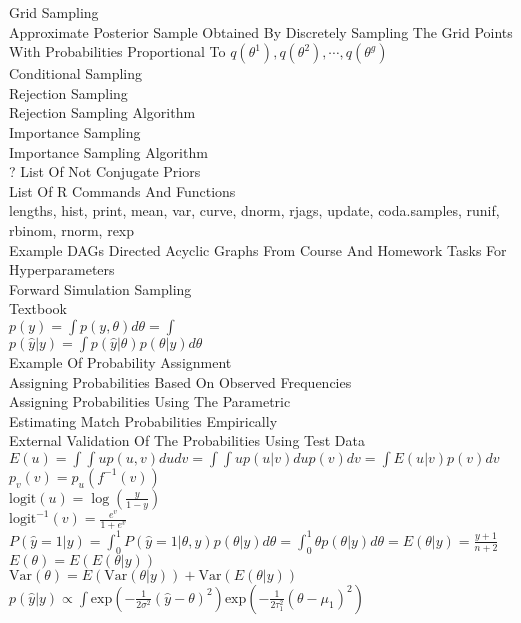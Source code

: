 Grid Sampling \\
Approximate Posterior Sample Obtained By Discretely Sampling The Grid Points With Probabilities Proportional To $q(\theta^1), q(\theta^2), \cdots, q(\theta^g)$ \\
Conditional Sampling \\
Rejection Sampling \\
Rejection Sampling Algorithm \\
Importance Sampling \\
Importance Sampling Algorithm \\
? List Of Not Conjugate Priors \\
List Of R Commands And Functions \\
lengths, hist, print, mean, var, curve, dnorm, rjags, update, coda.samples, runif, rbinom, rnorm, rexp \\
Example DAGs Directed Acyclic Graphs From Course And Homework Tasks For Hyperparameters \\
Forward Simulation Sampling \\
Textbook \\
$p(y)=\int p(y,\theta)d\theta=\int $ \\
$p(\hat{y}|y)=\int p(\hat{y}|\theta)p(\theta|y)d\theta$ \\
Example Of Probability Assignment \\
Assigning Probabilities Based On Observed Frequencies \\
Assigning Probabilities Using The Parametric \\
Estimating Match Probabilities Empirically \\
External Validation Of The Probabilities Using Test Data \\
$E(u)=\int \int up(u,v)dudv=\int \int up(u|v)du p(v)dv=\int E(u|v)p(v)dv$ \\
$p_v(v)=p_u(f^{-1}(v))$ \\
$\text{logit}(u)=\log \left(\frac{y}{1-y} \right)$ \\
$\text{logit}^{-1}(v)=\frac{e^v}{1+e^v}$ \\
$P(\hat{y}=1|y)=\int_0^1 P(\hat{y}=1|\theta,y)p(\theta|y)d\theta=\int_0^1 \theta p(\theta|y)d\theta=E(\theta|y)=\frac{y+1}{n+2}$ \\
$E(\theta)=E(E(\theta|y))$ \\
$\text{Var}(\theta)=E(\text{Var}(\theta|y))+\text{Var}(E(\theta|y))$ \\
$p(\hat{y}|y)\propto \int \text{exp}\left(-\frac{1}{2\sigma^2}(\hat{y}-\theta)^2 \right)\text{exp}\left(-\frac{1}{2\tau_1^2}(\theta-\mu_1)^2 \right)$ \\
